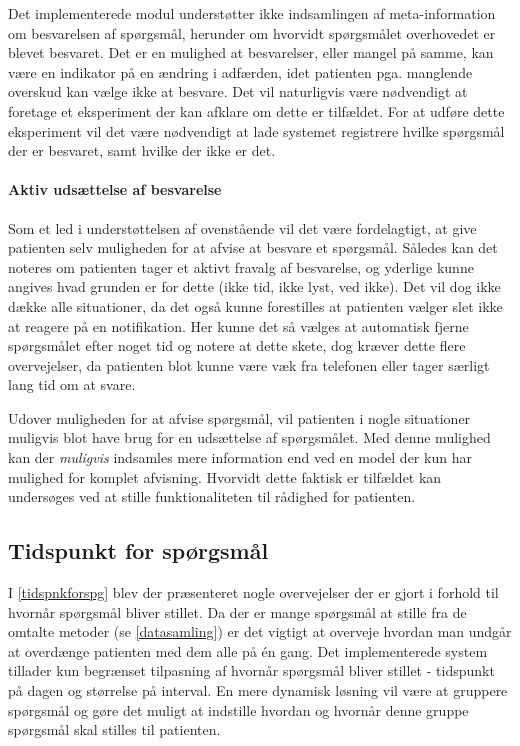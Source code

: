 Det implementerede modul understøtter ikke indsamlingen af meta-information om besvarelsen af spørgsmål, herunder om hvorvidt spørgsmålet overhovedet er blevet besvaret.
Det er en mulighed at besvarelser, eller mangel på samme, kan være en indikator på en ændring i adfærden, idet patienten pga. manglende overskud kan vælge ikke at besvare.
Det vil naturligvis være nødvendigt at foretage et eksperiment der kan afklare om dette er tilfældet.
For at udføre dette eksperiment vil det være nødvendigt at lade systemet registrere hvilke spørgsmål der er besvaret, samt hvilke der ikke er det.

\paragraph{Aktiv udsættelse af besvarelse}
Som et led i understøttelsen af ovenstående vil det være fordelagtigt, at give patienten selv muligheden for at afvise at besvare et spørgsmål.
Således kan det noteres om patienten tager et aktivt fravalg af besvarelse, og yderlige kunne angives hvad grunden er for dette (ikke tid, ikke lyst, ved ikke).
Det vil dog ikke dække alle situationer, da det også kunne forestilles at patienten vælger slet ikke at reagere på en notifikation.
Her kunne det så vælges at automatisk fjerne spørgsmålet efter noget tid og notere at dette skete, dog kræver dette flere overvejelser, da patienten blot kunne være væk fra telefonen eller tager særligt lang tid om at svare.

Udover muligheden for at afvise spørgsmål, vil patienten i nogle situationer muligvis blot have brug for en udsættelse af spørgsmålet.
Med denne mulighed kan der \textit{muligvis} indsamles mere information end ved en model der kun har mulighed for komplet afvisning.
Hvorvidt dette faktisk er tilfældet kan undersøges ved at stille funktionaliteten til rådighed for patienten.

\subsection{Tidspunkt for spørgsmål}\label{refleksion:tidspunkt}
I \cref{tidspnkforspg} blev der præsenteret nogle overvejelser der er gjort i forhold til hvornår spørgsmål bliver stillet.
Da der er mange spørgsmål at stille fra de omtalte metoder (se \cref{datasamling}) er det vigtigt at overveje hvordan man undgår at overdænge patienten med dem alle på én gang.
Det implementerede system tillader kun begrænset tilpasning af hvornår spørgsmål bliver stillet - tidspunkt på dagen og størrelse på interval.
En mere dynamisk løsning vil være at gruppere spørgsmål og gøre det muligt at indstille hvordan og hvornår denne gruppe spørgsmål skal stilles til patienten.

